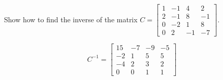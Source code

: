 
\begin{exerciseStatement}


Show how to find the inverse of the matrix \(C= \left[\begin{array}{cccc}
1 & -1 & 4 & 2 \\
2 & -1 & 8 & -1 \\
0 & -2 & 1 & 8 \\
0 & 2 & -1 & -7
\end{array}\right] \).


\end{exerciseStatement}
    
\begin{exerciseAnswer} 
\[C^{-1}= \left[\begin{array}{cccc}
15 & -7 & -9 & -5 \\
-2 & 1 & 5 & 5 \\
-4 & 2 & 3 & 2 \\
0 & 0 & 1 & 1
\end{array}\right] \]
\end{exerciseAnswer}
    
